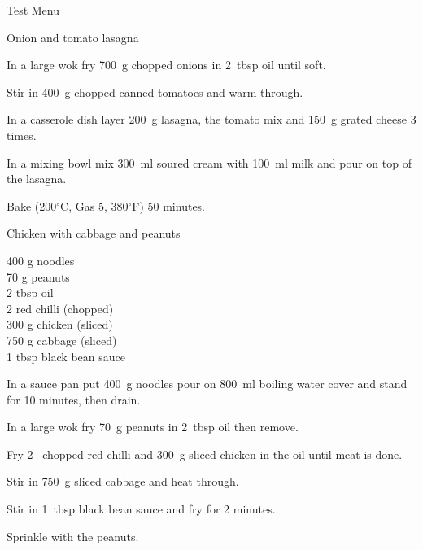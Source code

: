 \begin{menu}{Test Menu}
\begin{recipe}{2}{Onion and tomato lasagna}
\begin{ingredients}
		\end{ingredients}
	
	
    \begin{instructions}
    \item 
        In a large wok fry
        700~g chopped onions
        in
        2~tbsp  oil
        until soft.
      \item 
        Stir in 400~g chopped canned tomatoes
        and warm through.
      \item 
        In a casserole dish layer
        200~g  lasagna,
        the tomato mix and
        150~g grated cheese
        3 times.
      \item 
        In a mixing bowl mix
        300~ml  soured cream
        with
        100~ml  milk
        and pour on top of the lasagna.
      \item 
        Bake 
      (200$^{\circ}$C, Gas 5, 380$^{\circ}$F)
     50 minutes.
      
    \end{instructions}
    \end{recipe}%
  
    \begin{recipe}{2}{Chicken with cabbage and peanuts}%
    
		\begin{ingredients}
		400 g noodles  \\
	70 g peanuts  \\
	2 tbsp oil  \\
	2  red chilli (chopped) \\
	300 g chicken (sliced) \\
	750 g cabbage (sliced) \\
	1 tbsp black bean sauce  \\
	
		\end{ingredients}
	
    \begin{instructions}
    \item 
      In a sauce pan
      put
      400~g  noodles
      pour on
      800~ml  boiling water
      cover and stand for 10 minutes, then drain.
    \item 
        In a large wok	fry
        70~g  peanuts
        in
        2~tbsp  oil
        then remove.
      \item 
        Fry 2~ chopped red chilli
        and
        300~g sliced chicken
        in the oil until meat is done.
      \item 
        Stir in
        750~g sliced cabbage
        and heat through.
      \item 
        Stir in
        1~tbsp  black bean sauce
        and fry for 2 minutes.
      \item 
        Sprinkle with the peanuts.
      

\end{instructions}
\end{recipe}
\end{menu}
